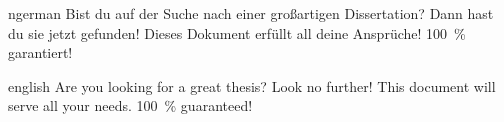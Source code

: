 \maketitle

\begin{Abstract}{ngerman}
    Bist du auf der Suche nach einer großartigen Dissertation?
    Dann hast du sie jetzt gefunden!
    Dieses Dokument erfüllt all deine Ansprüche!
    \SI{100}{\percent} garantiert!
\end{Abstract}

\begin{Abstract}{english}
    Are you looking for a great thesis?
    Look no further!
    This document will serve all your needs.
    \SI{100}{\percent} guaranteed!
\end{Abstract}

\listoftodos
\tableofcontents
